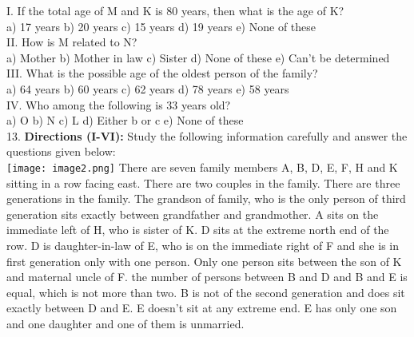 \documentclass[
]{article}
\begin{document}
I. If the total age of M and K is 80 years, then what is the age of K?\\
a) 17 years \hspace{2mm}b) 20 years \hspace{2mm}c) 15 years \hspace{2mm}d) 19 years \hspace{2mm}e) None of these\\

II. How is M related to N?\\
a) Mother \hspace{2mm}b) Mother in law \hspace{2mm}c) Sister
\hspace{2mm}d) None of these \hspace{2mm}e) Can’t be determined\\

III. What is the possible age of the oldest person of the family?\\
a) 64 years \hspace{2mm}b) 60 years \hspace{2mm}c) 62 years \hspace{2mm}d) 78 years \hspace{2mm}e) 58 years\\

IV. Who among the following is 33 years old?\\
a) O \hspace{2mm}b) N \hspace{2mm}c) L
\hspace{2mm}d) Either b or c \hspace{2mm}e) None of these\\

13. \textbf{Directions (I-VI):} Study the following information carefully and answer the questions given
below:\\
\texttt{[image: image2.png]}
There are seven family members A, B, D, E, F, H and K sitting in a row facing east. There are
two couples in the family. There are three generations in the family. The grandson of family,
who is the only person of third generation sits exactly between grandfather and
grandmother. A sits on the immediate left of H, who is sister of K. D sits at the extreme
north end of the row. D is daughter-in-law of E, who is on the immediate right of F and she
is in first generation only with one person. Only one person sits between the son of K and
maternal uncle of F. the number of persons between B and D and B and E is equal, which is
not more than two. B is not of the second generation and does sit exactly between D and E. E
doesn’t sit at any extreme end. E has only one son and one daughter and one of them is
unmarried.\\
\end{document}
